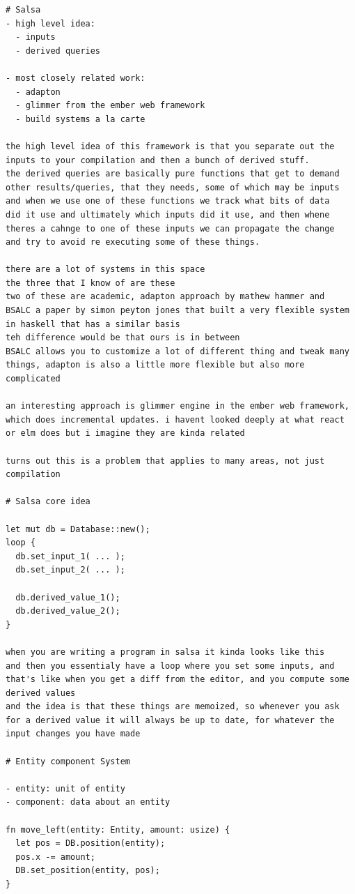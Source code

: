 \documentclass[12pt, a4paper]{report}
\begin{document}
\begin{verbatim}
# Salsa
- high level idea:
  - inputs
  - derived queries

- most closely related work:
  - adapton
  - glimmer from the ember web framework
  - build systems a la carte

the high level idea of this framework is that you separate out the
inputs to your compilation and then a bunch of derived stuff.
the derived queries are basically pure functions that get to demand
other results/queries, that they needs, some of which may be inputs
and when we use one of these functions we track what bits of data
did it use and ultimately which inputs did it use, and then whene
theres a cahnge to one of these inputs we can propagate the change
and try to avoid re executing some of these things.

there are a lot of systems in this space
the three that I know of are these
two of these are academic, adapton approach by mathew hammer and
BSALC a paper by simon peyton jones that built a very flexible system
in haskell that has a similar basis
teh difference would be that ours is in between
BSALC allows you to customize a lot of different thing and tweak many
things, adapton is also a little more flexible but also more
complicated

an interesting approach is glimmer engine in the ember web framework,
which does incremental updates. i havent looked deeply at what react
or elm does but i imagine they are kinda related

turns out this is a problem that applies to many areas, not just
compilation

# Salsa core idea

let mut db = Database::new();
loop {
  db.set_input_1( ... );
  db.set_input_2( ... );

  db.derived_value_1();
  db.derived_value_2();
}

when you are writing a program in salsa it kinda looks like this
and then you essentialy have a loop where you set some inputs, and
that's like when you get a diff from the editor, and you compute some
derived values
and the idea is that these things are memoized, so whenever you ask
for a derived value it will always be up to date, for whatever the
input changes you have made

# Entity component System

- entity: unit of entity
- component: data about an entity

fn move_left(entity: Entity, amount: usize) {
  let pos = DB.position(entity);
  pos.x -= amount;
  DB.set_position(entity, pos);
}


\end{verbatim}
\end{document}
